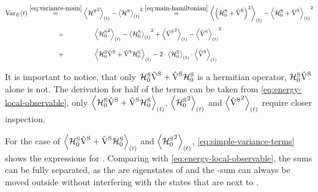 \begin{equation}
    \label{eq:variance-split}
    \begin{split}
        \varianceOft &\stackrel{\ref{eq:variance-main}}{=} \timeExpectationVal{{\pictureHamiltonian[\schroedingerPicture]}^2} - {\timeExpectationVal{\pictureHamiltonian[\schroedingerPicture]}}^2
        \stackrel{\ref{eq:main-hamiltonian}}{=} \timeExpectationVal{\left(\HzeroHamiltonian[\schroedingerPicture] + \Vhamiltonian[\schroedingerPicture]\right)^2} - {\timeExpectationVal{\HzeroHamiltonian[\schroedingerPicture] + \Vhamiltonian[\schroedingerPicture]}}^2
        \\&\stackrel{\phantom{\ref{eq:main-hamiltonian}}}{=}
        \timeExpectationVal{{\HzeroHamiltonian[\schroedingerPicture]}^2} - {\timeExpectationVal{\HzeroHamiltonian[\schroedingerPicture]}}^2
        +
        \timeExpectationVal{{\Vhamiltonian[\schroedingerPicture]}^2} - {\timeExpectationVal{\Vhamiltonian[\schroedingerPicture]}}^2
        \\&\stackrel{\phantom{\ref{eq:main-hamiltonian}}}{+}
        \timeExpectationVal{\HzeroHamiltonian[\schroedingerPicture]\Vhamiltonian[\schroedingerPicture] + \Vhamiltonian[\schroedingerPicture]\HzeroHamiltonian[\schroedingerPicture]}
        -        2\cdot 
        \timeExpectationVal{\HzeroHamiltonian[\schroedingerPicture]}\cdot \timeExpectationVal{\Vhamiltonian[\schroedingerPicture]}
    \end{split}
\end{equation}

It is important to notice, that only $\HzeroHamiltonian[\schroedingerPicture]\Vhamiltonian[\schroedingerPicture] + \Vhamiltonian[\schroedingerPicture]\HzeroHamiltonian[\schroedingerPicture]$ is a hermitian operator, $\HzeroHamiltonian[\schroedingerPicture]\Vhamiltonian[\schroedingerPicture]$ alone is not.
The derivation for half of the terms can be taken from \autoref{eq:energy-local-observable}, only $\timeExpectationVal{\HzeroHamiltonian[\schroedingerPicture]\Vhamiltonian[\schroedingerPicture] + \Vhamiltonian[\schroedingerPicture]\HzeroHamiltonian[\schroedingerPicture]}$, $\timeExpectationVal{{\HzeroHamiltonian[\schroedingerPicture]}^2}$ and $\timeExpectationVal{{\Vhamiltonian[\schroedingerPicture]}^2}$ require closer inspection.

For the case of $\timeExpectationVal{\HzeroHamiltonian[\schroedingerPicture]\Vhamiltonian[\schroedingerPicture] + \Vhamiltonian[\schroedingerPicture]\HzeroHamiltonian[\schroedingerPicture]}$ and $\timeExpectationVal{{\HzeroHamiltonian[\schroedingerPicture]}^2}$, \autoref{eq:simple-variance-terms} shows the expressions for . Comparing with \autoref{eq:energy-local-observable}, the sums can be fully separated, as the \ketN[N] are eigenstates of \HzeroHamiltonian[\schroedingerPicture] and the \HzeroHamiltonian[\schroedingerPicture]-sum can always be moved outside without interfering with the states that are next to \Vhamiltonian[\schroedingerPicture].


